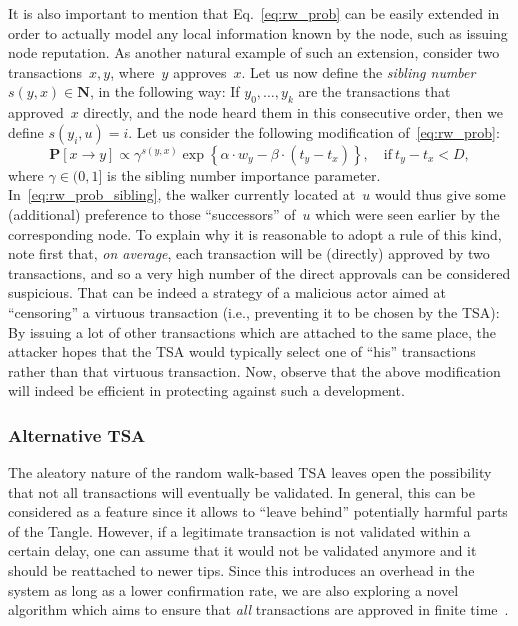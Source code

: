 \documentclass[../main.tex]{subfiles}
\begin{document}
It is also important to mention that Eq.~\eqref{eq:rw_prob} can be easily extended in order to actually model any local information known by the node, such as issuing node reputation.
As another natural example of such an extension, consider two transactions~$x,y$, where~$y$ approves~$x$. Let us now define the \emph{sibling number}
$s(y,x)\in \mathbf{N}$, in the following way: If $y_0,\ldots ,y_k$ are
the transactions that
approved~$x$ directly, and the node heard them in this consecutive order,
then we define $s(y_i,u)=i$.
Let us consider the following modification of~\eqref{eq:rw_prob}:
\begin{equation}\label{eq:rw_prob_sibling}
    \mathbf{P}[x\rightarrow y]\propto \gamma^{s(y,x)}\exp\left\{\alpha\cdot w_y - \beta\cdot(t_y-t_x)\right\}, \quad \text{if} \ t_y - t_x < D,
\end{equation}
where $\gamma\in (0,1]$ is the sibling number importance parameter.
In~\eqref{eq:rw_prob_sibling}, the walker
currently located at~$u$ would thus give some
(additional) preference to those ``successors'' of~$u$ which 
were seen earlier by the corresponding node. 
To explain why it is reasonable to adopt a rule of this kind, 
note first that, \emph{on average}, each transaction will be
(directly) approved by two transactions, and so a very high number
of the direct approvals can be considered suspicious. That can be indeed a 
strategy of a malicious actor aimed at ``censoring'' a virtuous 
transaction (i.e., preventing it to be chosen by the TSA): 
By issuing a lot of other transactions which are attached to the same
place, the attacker hopes that the TSA would typically select one
of ``his'' transactions rather than that virtuous 
transaction. Now, observe that the above modification will indeed
be efficient in protecting against such a development.

\subsubsection{Alternative TSA}\label{sec:tsa_non-rw}

The aleatory nature of the random walk-based TSA leaves open the possibility that not all transactions will eventually be validated. In general, this can be considered as a feature since it allows to ``leave behind'' potentially harmful parts of the Tangle. However, if a legitimate transaction is not validated within a certain delay, one can assume that it would not be validated anymore and it should be reattached to newer tips. Since this introduces an overhead in the system as long as a lower confirmation rate, we are also exploring a novel algorithm which aims to ensure that \textit{all} transactions are approved in finite time~\cite{shorten2018}.
\end{document}
